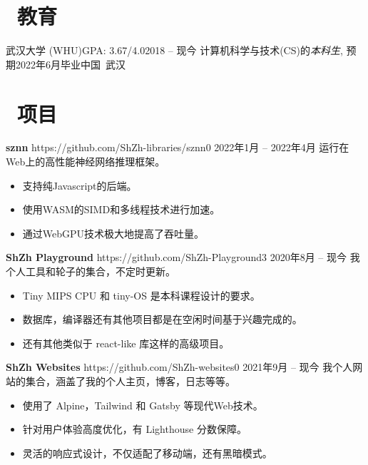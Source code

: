 \documentclass{common}
\begin{document}

\section{\faGraduationCap\ 教育}
\educationsubsection
    {武汉大学 (WHU)}{GPA: 3.67/4.0}{2018 -- 现今}
    {计算机科学与技术(CS)的\textit{本科生}, 预期2022年6月毕业}{中国\ 武汉}

\section{\faCubes\ 项目}
\projectsubsection
    {\textbf{sznn}}
    {https://github.com/ShZh-libraries/sznn}{0}
    {2022年1月 -- 2022年4月}
运行在Web上的高性能神经网络推理框架。
\begin{itemize}
    \item 支持纯Javascript的后端。
    \item 使用WASM的SIMD和多线程技术进行加速。
    \item 通过WebGPU技术极大地提高了吞吐量。
\end{itemize}
\projectsubsection
    {\textbf{ShZh Playground}}
    {https://github.com/ShZh-Playground}{3}
    {2020年8月 -- 现今}
我个人工具和轮子的集合，不定时更新。
\begin{itemize}
    \item Tiny MIPS CPU 和 tiny-OS 是本科课程设计的要求。
    \item 数据库，编译器还有其他项目都是在空闲时间基于兴趣完成的。
    \item 还有其他类似于 react-like 库这样的高级项目。
\end{itemize}
\projectsubsection
    {\textbf{ShZh Websites}}
    {https://github.com/ShZh-websites}{0}
    {2021年9月 -- 现今}
我个人网站的集合，涵盖了我的个人主页，博客，日志等等。
\begin{itemize}
    \item 使用了 Alpine，Tailwind 和 Gatsby 等现代Web技术。
    \item 针对用户体验高度优化，有 Lighthouse 分数保障。
    \item 灵活的响应式设计，不仅适配了移动端，还有黑暗模式。
\end{itemize}
\end{document}
